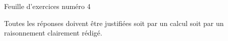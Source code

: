 \documentclass[a4paper,12pt]{article}
\begin{document}

\thispagestyle{empty}

\large
\begin{center}
    Feuille d'exercices numéro 4
\end{center}


\tiny
\begin{center}
    Toutes les réponses doivent être justifiées soit par un calcul soit par un raisonnement clairement rédigé.
\end{center}
\normalsize

\end{document}
